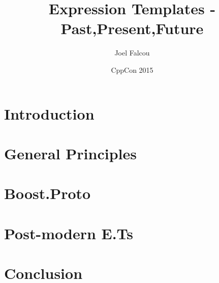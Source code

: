 \documentclass{beamer}
\institute{LRI}
\title[CppCon15]{Expression Templates - Past,Present,Future}
\author[J.~Falcou]{Joel Falcou}
\institute{NumScale -- LRI}
\date{CppCon 2015}
\begin{document}



\begin{frame}[plain]
\titlepage
\end{frame}


\section{Introduction}


\section{General Principles}


\section{Boost.Proto}


\section{Post-modern E.Ts}


\section{Conclusion}


\end{document}
